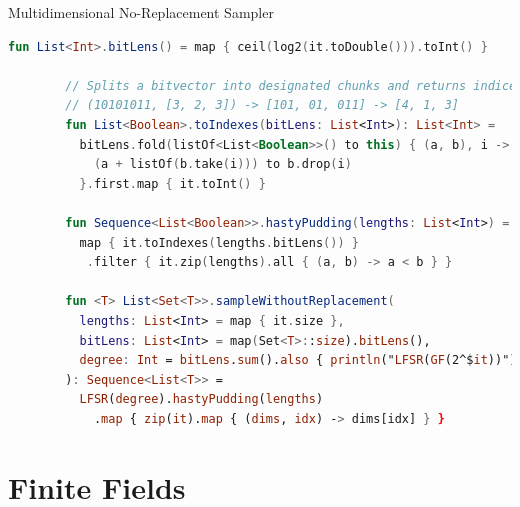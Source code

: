 \documentclass{beamer}
\begin{document}
    \begin{frame}[fragile]{Multidimensional No-Replacement Sampler}
        \begin{lstlisting}[language=Kotlin, gobble=8]
        fun List<Int>.bitLens() = map { ceil(log2(it.toDouble())).toInt() }

        // Splits a bitvector into designated chunks and returns indices
        // (10101011, [3, 2, 3]) -> [101, 01, 011] -> [4, 1, 3]
        fun List<Boolean>.toIndexes(bitLens: List<Int>): List<Int> =
          bitLens.fold(listOf<List<Boolean>>() to this) { (a, b), i ->
            (a + listOf(b.take(i))) to b.drop(i)
          }.first.map { it.toInt() }

        fun Sequence<List<Boolean>>.hastyPudding(lengths: List<Int>) =
          map { it.toIndexes(lengths.bitLens()) }
           .filter { it.zip(lengths).all { (a, b) -> a < b } }

        fun <T> List<Set<T>>.sampleWithoutReplacement(
          lengths: List<Int> = map { it.size },
          bitLens: List<Int> = map(Set<T>::size).bitLens(),
          degree: Int = bitLens.sum().also { println("LFSR(GF(2^$it))") }
        ): Sequence<List<T>> =
          LFSR(degree).hastyPudding(lengths)
            .map { zip(it).map { (dims, idx) -> dims[idx] } }
        \end{lstlisting}
    \end{frame}

    \section{Finite Fields}\label{sec:finite-fields}
\end{document}
